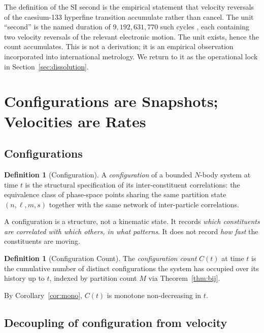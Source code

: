 \documentclass[twocolumn,10pt,a4paper]{article}
\theoremstyle{thmstyle}
\theoremstyle{definition}
\newtheorem{definition}[theorem]{Definition}
\theoremstyle{remark}
\begin{document}
The definition of the SI second is the empirical statement that
velocity reversals of the caesium-133 hyperfine transition accumulate
rather than cancel. The unit ``second'' is the named duration of
$9{,}192{,}631{,}770$ such cycles \citep{si2019}, each containing two
velocity reversals of the relevant electronic motion. The unit
exists, hence the count accumulates. This is not a derivation; it is
an empirical observation incorporated into international metrology.
We return to it as the operational lock in Section~\ref{sec:dissolution}.

\section{Configurations are Snapshots; Velocities are Rates}
\label{sec:configuration}

\subsection{Configurations}

\begin{definition}[Configuration]
\label{def:config}
A \emph{configuration} of a bounded $N$-body system at time $t$ is
the structural specification of its inter-constituent correlations:
the equivalence class of phase-space points sharing the same
partition state $(n,\ell,m,s)$ together with the same network of
inter-particle correlations.
\end{definition}

A configuration is a structure, not a kinematic state. It records
\emph{which constituents are correlated with which others, in what
patterns}. It does not record \emph{how fast} the constituents are
moving.

\begin{definition}[Configuration Count]
\label{def:Cc}
The \emph{configuration count} $C(t)$ at time $t$ is the cumulative
number of distinct configurations the system has occupied over its
history up to $t$, indexed by partition count $M$ via
Theorem~\ref{thm:bij}.
\end{definition}

By Corollary~\ref{cor:mono}, $C(t)$ is monotone non-decreasing in $t$.

\subsection{Decoupling of configuration from velocity}
\end{document}
